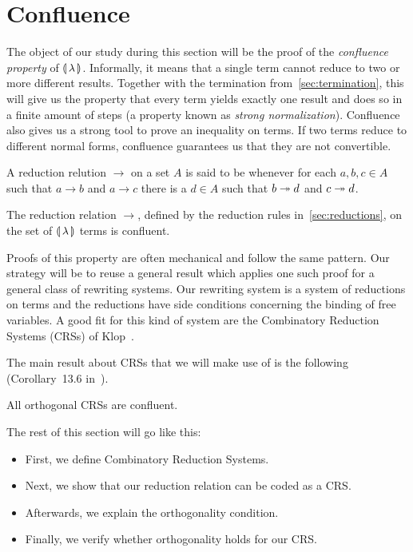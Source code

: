\section{Confluence}
\label{sec:confluence}

The object of our study during this section will be the proof of the
\emph{confluence property} of $\llparenthesis \, \lambda \, \rrparenthesis$. Informally, it means that
a single term cannot reduce to two or more different results. Together with
the termination from~\ref{sec:termination}, this will give us the property
that every term yields exactly one result and does so in a finite amount of
steps (a property known as \emph{strong normalization}). Confluence also
gives us a strong tool to prove an inequality on terms. If two terms reduce
to different normal forms, confluence guarantees us that they are not
convertible.

\begin{definition}
  A reduction relution $\to$ on a set $A$ is said to be 
  whenever for each $a,b,c \in A$ such that $a \to b$ and $a \to c$ there
  is a $d \in A$ such that $b \twoheadrightarrow d$ and $c \twoheadrightarrow d$.
\end{definition}

\begin{theorem}\label{thm:confluence}
  
  The reduction relation $\to$, defined by the reduction rules
  in~\ref{sec:reductions}, on the set of $\llparenthesis \, \lambda \, \rrparenthesis$ terms is
  confluent.
\end{theorem}

Proofs of this property are often mechanical and follow the same
pattern. Our strategy will be to reuse a general result which applies one
such proof for a general class of rewriting systems. Our rewriting system
is a system of reductions on terms and the reductions have side conditions
concerning the binding of free variables. A good fit for this kind of
system are the Combinatory Reduction Systems (CRSs) of
Klop~\cite{klop1993combinatory}.

The main result about CRSs that we will make use of is the following
(Corollary~13.6 in~\cite{klop1993combinatory}).

\begin{theorem}\label{thm:confluence-crs}

  All orthogonal CRSs are confluent.
\end{theorem}

The rest of this section will go like this:
\begin{itemize}
\item First, we define Combinatory Reduction Systems.
\item Next, we show that our reduction relation can be coded as a CRS.
\item Afterwards, we explain the orthogonality condition.
\item Finally, we verify whether orthogonality holds for our CRS.
\end{itemize}


